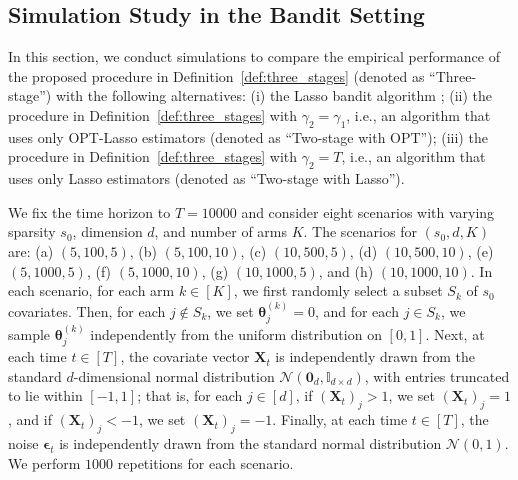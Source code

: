 \documentclass[aos,preprint]{imsart}
\theoremstyle{plain}
\theoremstyle{definition}
\newcommand{\btheta}{\boldsymbol{\theta}}
\newcommand{\bd}[1]{\boldsymbol{#1}}
\newcommand{\bX}{\boldsymbol{X}}
\newcommand{\bepsilon}{\bd{\epsilon}}
\begin{document}
\subsection{Simulation Study in the Bandit Setting} \label{sec: bandit simulation}
In this section, we conduct simulations to compare the empirical performance of the proposed procedure in Definition~\ref{def:three_stages} (denoted as ``Three-stage'') with the following alternatives:  
(i) the Lasso bandit algorithm \citep{bastani2020online};  
(ii) the procedure in Definition~\ref{def:three_stages} with $\gamma_2 = \gamma_1$, i.e., an algorithm that uses only OPT-Lasso estimators (denoted as ``Two-stage with OPT'');  
(iii) the procedure in Definition~\ref{def:three_stages} with $\gamma_2 = T$, i.e., an algorithm that uses only Lasso estimators (denoted as ``Two-stage with Lasso'').


We fix the time horizon to $T = 10000$ and consider eight scenarios with varying sparsity $s_0$, dimension $d$, and number of arms $K$. The scenarios for $(s_0, d, K)$ are: (a) $(5, 100, 5)$, (b) $(5, 100, 10)$, (c) $(10, 500, 5)$, (d) $(10, 500, 10)$, (e) $(5, 1000, 5)$, (f) $(5, 1000, 10)$, (g) $(10, 1000, 5)$, and (h) $(10, 1000, 10)$.
In each scenario, for each arm $k \in [K]$, we first randomly select a subset $S_k$ of $s_0$ covariates. Then, for each $j \notin S_k$, we set $\btheta^{(k)}_j = 0$, and for each $j \in S_k$, we sample $\btheta^{(k)}_j$ independently from the uniform distribution on $[0,1]$.  
Next, at each time $t \in [T]$, the covariate vector $\bX_t$ is independently drawn from the standard $d$-dimensional normal distribution $\mathcal{N}(\mathbf{0}_d, \mathbb{I}_{d \times d})$, with entries truncated to lie within $[-1, 1]$; that is, for each $j \in [d]$, if $(\bX_t)_j > 1$, we set $(\bX_t)_j = 1$, and if $(\bX_t)_j < -1$, we set $(\bX_t)_j = -1$.  
Finally, at each time $t \in [T]$, the noise $\bepsilon_t$ is independently drawn from the standard normal distribution $\mathcal{N}(0,1)$.  
We perform $1000$ repetitions for each scenario.
\end{document}
